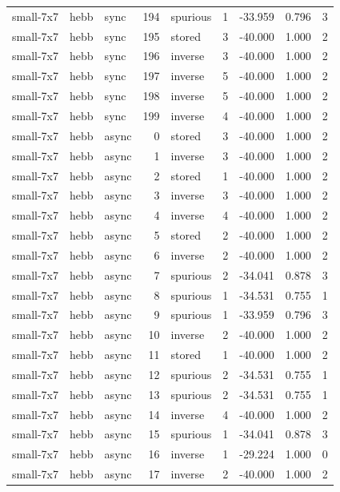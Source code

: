 \begin{tabular}{lllrlrrrr}
small-7x7 & hebb & sync & 194 & spurious & 1 & -33.959 & 0.796 & 3 \\
small-7x7 & hebb & sync & 195 & stored & 3 & -40.000 & 1.000 & 2 \\
small-7x7 & hebb & sync & 196 & inverse & 3 & -40.000 & 1.000 & 2 \\
small-7x7 & hebb & sync & 197 & inverse & 5 & -40.000 & 1.000 & 2 \\
small-7x7 & hebb & sync & 198 & inverse & 5 & -40.000 & 1.000 & 2 \\
small-7x7 & hebb & sync & 199 & inverse & 4 & -40.000 & 1.000 & 2 \\
small-7x7 & hebb & async & 0 & stored & 3 & -40.000 & 1.000 & 2 \\
small-7x7 & hebb & async & 1 & inverse & 3 & -40.000 & 1.000 & 2 \\
small-7x7 & hebb & async & 2 & stored & 1 & -40.000 & 1.000 & 2 \\
small-7x7 & hebb & async & 3 & inverse & 3 & -40.000 & 1.000 & 2 \\
small-7x7 & hebb & async & 4 & inverse & 4 & -40.000 & 1.000 & 2 \\
small-7x7 & hebb & async & 5 & stored & 2 & -40.000 & 1.000 & 2 \\
small-7x7 & hebb & async & 6 & inverse & 2 & -40.000 & 1.000 & 2 \\
small-7x7 & hebb & async & 7 & spurious & 2 & -34.041 & 0.878 & 3 \\
small-7x7 & hebb & async & 8 & spurious & 1 & -34.531 & 0.755 & 1 \\
small-7x7 & hebb & async & 9 & spurious & 1 & -33.959 & 0.796 & 3 \\
small-7x7 & hebb & async & 10 & inverse & 2 & -40.000 & 1.000 & 2 \\
small-7x7 & hebb & async & 11 & stored & 1 & -40.000 & 1.000 & 2 \\
small-7x7 & hebb & async & 12 & spurious & 2 & -34.531 & 0.755 & 1 \\
small-7x7 & hebb & async & 13 & spurious & 2 & -34.531 & 0.755 & 1 \\
small-7x7 & hebb & async & 14 & inverse & 4 & -40.000 & 1.000 & 2 \\
small-7x7 & hebb & async & 15 & spurious & 1 & -34.041 & 0.878 & 3 \\
small-7x7 & hebb & async & 16 & inverse & 1 & -29.224 & 1.000 & 0 \\
small-7x7 & hebb & async & 17 & inverse & 2 & -40.000 & 1.000 & 2 \\

\end{tabular}

